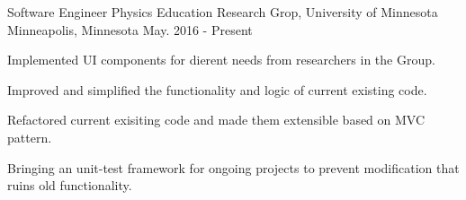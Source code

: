 

\begin{cventries}

  \cventry
    {Software Engineer} %
    {Physics Education Research Grop, University of Minnesota} %
    {Minneapolis, Minnesota} %
    {May. 2016 - Present} %
    {
      \begin{cvitems} %
        \item {Implemented UI components for dierent needs from researchers
         in the Group.}
        \item{Improved and simplified the functionality and logic of current existing code.}
        \item{Refactored current exisiting code and made them extensible based on MVC pattern.}
        \item{Bringing an unit-test framework for ongoing projects to prevent modification that ruins old functionality.}
      \end{cvitems}
    }

\end{cventries}
